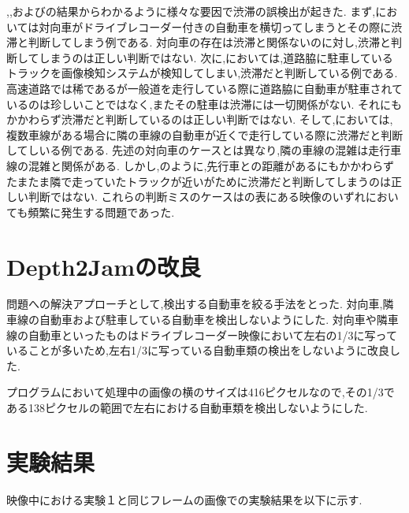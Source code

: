 ,,およびの結果からわかるように様々な要因で渋滞の誤検出が起きた.
まず,においては対向車がドライブレコーダー付きの自動車を横切ってしまうとその際に渋滞と判断してしまう例である.
対向車の存在は渋滞と関係ないのに対し,渋滞と判断してしまうのは正しい判断ではない.
次に,においては,道路脇に駐車しているトラックを画像検知システムが検知してしまい,渋滞だと判断している例である.
高速道路では稀であるが一般道を走行している際に道路脇に自動車が駐車されているのは珍しいことではなく,またその駐車は渋滞には一切関係がない.
それにもかかわらず渋滞だと判断しているのは正しい判断ではない.
そして,においては,複数車線がある場合に隣の車線の自動車が近くで走行している際に渋滞だと判断してしいる例である.
先述の対向車のケースとは異なり,隣の車線の混雑は走行車線の混雑と関係がある.
しかし,のように,先行車との距離があるにもかかわらずたまたま隣で走っていたトラックが近いがために渋滞だと判断してしまうのは正しい判断ではない.
これらの判断ミスのケースはの表にある映像のいずれにおいても頻繁に発生する問題であった.

\newpage
\section{Depth2Jamの改良}
問題への解決アプローチとして,検出する自動車を絞る手法をとった.
対向車,隣車線の自動車および駐車している自動車を検出しないようにした.
対向車や隣車線の自動車といったものはドライブレコーダー映像において左右の1/3に写っていることが多いため,左右1/3に写っている自動車類の検出をしないように改良した.

プログラムにおいて処理中の画像の横のサイズは416ピクセルなので,その1/3である138ピクセルの範囲で左右における自動車類を検出しないようにした.

\section{実験結果}
映像中における実験１と同じフレームの画像での実験結果を以下に示す.

